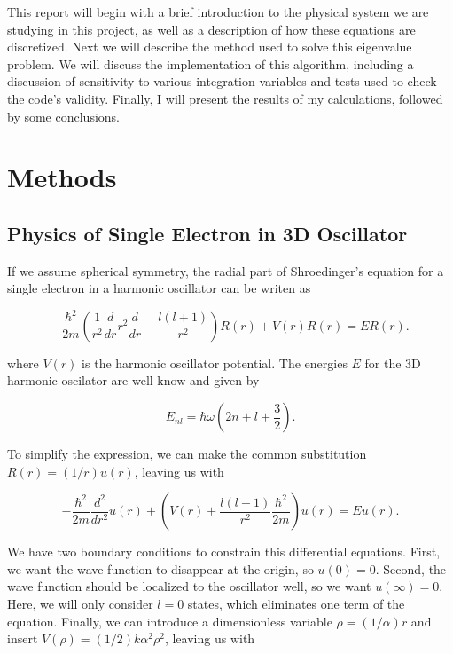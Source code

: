 \documentclass[%
oneside,                 %
final,                   %
10pt]{article}
\begin{document}
This report will begin with a brief introduction to the physical system we are studying in this project, as well as a description of how these equations are discretized.  Next we will describe the method used to solve this eigenvalue problem.  We will discuss the implementation of this algorithm, including a discussion of sensitivity to various integration variables and tests used to check the code's validity.  Finally, I will present the results of my calculations, followed by some conclusions.
\section{Methods}

\subsection{Physics of Single Electron in 3D Oscillator}

If we assume spherical symmetry, the radial part of Shroedinger's equation for a single electron in a harmonic oscillator can be writen as

\begin{equation*}
  -\frac{\hbar^2}{2 m} \left ( \frac{1}{r^2} \frac{d}{dr} r^2
  \frac{d}{dr} - \frac{l (l + 1)}{r^2} \right )R(r) 
     + V(r) R(r) = E R(r).
\end{equation*}

where $V(r)$ is the harmonic oscillator potential.  The energies $E$ for the 3D harmonic oscilator are well know and given by

\begin{equation*}
E_{nl}=  \hbar \omega \left(2n+l+\frac{3}{2}\right).
\end{equation*}

To simplify the expression, we can make the common substitution $R(r) = (1/r) u(r)$, leaving us with
% 

\begin{equation*}
  -\frac{\hbar^2}{2 m} \frac{d^2}{dr^2} u(r) 
       + \left ( V(r) + \frac{l (l + 1)}{r^2}\frac{\hbar^2}{2 m}
                                    \right ) u(r)  = E u(r) .
\end{equation*}
% 

We have two boundary conditions to constrain this differential equations.  First, we want the wave function to disappear at the origin, so $u(0)=0$.  Second, the wave function should be localized to the oscillator well, so we want $u(\infty)=0$.  Here, we will only consider $l=0$ states, which eliminates one term of the equation.  Finally, we can introduce a dimensionless variable $\rho = (1/\alpha) r$ and insert  $V(\rho) = (1/2) k \alpha^2\rho^2$, leaving us with
\end{document}
